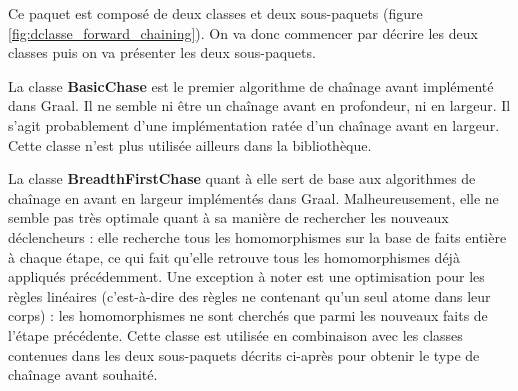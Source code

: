          Ce paquet est composé de deux classes et deux sous-paquets (figure \ref{fig:dclasse_forward_chaining}). On va donc commencer par décrire les deux classes puis on va présenter les deux sous-paquets.
         \par La classe \textbf{BasicChase} est le premier algorithme de chaînage avant implémenté dans Graal. Il ne semble ni être un chaînage avant en profondeur, ni en largeur. Il s'agit probablement d'une implémentation ratée d'un chaînage avant en largeur. Cette classe n'est plus utilisée ailleurs dans la bibliothèque.
         \par La classe \textbf{BreadthFirstChase} quant à elle sert de base aux algorithmes de chaînage en avant en largeur implémentés dans Graal. Malheureusement, elle ne semble pas très optimale quant à sa manière de rechercher les nouveaux déclencheurs : elle recherche tous les homomorphismes sur la base de faits entière à chaque étape, ce qui fait qu'elle retrouve tous les homomorphismes déjà appliqués précédemment. Une exception à noter est une optimisation pour les règles linéaires (c'est-à-dire des règles ne contenant qu'un seul atome dans leur corps) : les homomorphismes ne sont cherchés que parmi les nouveaux faits de l'étape précédente. Cette classe est utilisée en combinaison avec les classes contenues dans les deux sous-paquets décrits ci-après pour obtenir le type de chaînage avant souhaité.
         
